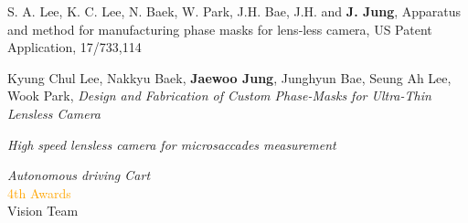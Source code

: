 \documentclass[a4paper,12pt]{memoir} %
\begin{document}

{S. A. Lee, K. C. Lee, N. Baek, W. Park, J.H. Bae, J.H. and \textbf{J. Jung}, Apparatus and method for manufacturing phase masks for lens‐less camera, US Patent Application, 17/733,114}


\Sep




{Kyung Chul Lee, Nakkyu Baek, \textbf{Jaewoo Jung}, Junghyun Bae, Seung Ah Lee, Wook Park, \textit{Design and Fabrication of Custom Phase-Masks for Ultra-Thin Lensless Camera}}


\clearpage %

\userinformation %

\framebreak %

\Sep



{\textit{High speed lensless camera for microsaccades measurement}}



{\textit{Autonomous driving Cart}\\\textcolor{orange}{4th Awards}\\{Vision Team}}
\end{document}

